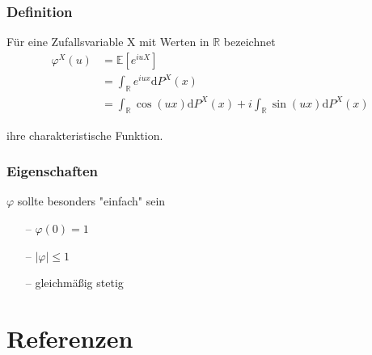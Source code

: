 \documentclass{beamer}
\newcommand{\R}{\mathbb{R}}
\newcommand{\E}{\mathbb{E}}
\newcommand\dint{\mathord{\mathrm{d}}}
\begin{document}
\begin{frame}
\frametitle{Definition}
Für eine Zufallsvariable X mit Werten in $\R$ bezeichnet
\begin{align} \label{eq1}
\varphi^X(u) &= \E[e^{iuX}] \\
 & = \int_{\R} e^{iux} \dint P^X(x)\\
 & = \int_{\R} \cos(ux) \dint P^X(x) + i \int_{\R} \sin(ux) \dint P^X(x)
\end{align}

ihre charakteristische Funktion.

\end{frame}

\begin{frame}
\frametitle{Eigenschaften}
$\varphi$ sollte besonders "einfach" sein
\hfill \newline
\begin{itemize}
    \setlength\itemsep{1em}
    \item[--] $\varphi(0) = 1$
    \item[--] $|\varphi| \leq 1$
    \item[--] gleichmäßig stetig
\end{itemize}
\end{frame}

\section*{Referenzen}

\end{document}

